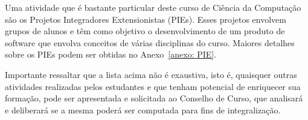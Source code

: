 Uma atividade que é bastante particular deste curso de Ciência da Computação são os Projetos Integradores Extensionistas (PIEs). Esses projetos envolvem grupos de alunos e têm como objetivo o desenvolvimento de um produto de software que envolva conceitos de várias disciplinas do curso. Maiores detalhes sobre os PIEs podem ser obtidas no Anexo~\ref{anexo: PIE}.

Importante ressaltar que a lista acima não é exaustiva, isto é, quaisquer outras atividades realizadas pelos estudantes e que tenham potencial de enriquecer sua formação, pode ser apresentada e solicitada ao Conselho de Curso, que analisará e deliberará se a mesma poderá ser computada para fins de integralização. 








